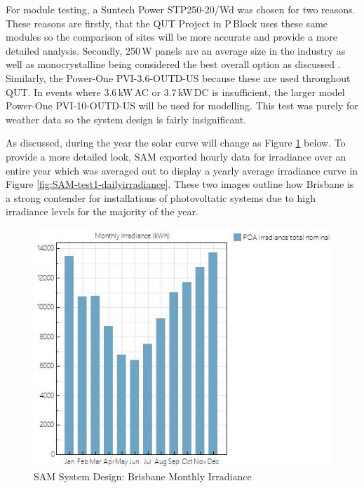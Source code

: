 For module testing, a Suntech Power STP250-20/Wd was chosen for two reasons. These reasons are firstly, that the QUT Project in P\,Block uses these same modules so the comparison of sites will be more accurate and provide a more detailed analysis. Secondly, 250\,W panels are an average size in the industry as well as monocrystalline being considered the best overall option as discussed \cite{Haberlin2012}. Similarly, the Power-One PVI-3.6-OUTD-US because these are used throughout QUT. In events where 3.6\,kW\,AC or 3.7\,kW\,DC is insufficient, the larger model Power-One PVI-10-OUTD-US will be used for modelling. This test was purely for weather data so the system design is fairly insignificant.  
\newline

As discussed, during the year the solar curve will change as Figure \ref{fig:SAM-test1-monthlyirradiance} below. To provide a more detailed look, SAM exported hourly data for irradiance over an entire year which was averaged out to display a yearly average irradiance curve in Figure \ref{fig:SAM-test1-dailyirradiance}. These two images outline how Brisbane is a strong contender for installations of photovoltatic systems due to high irradiance levels for the majority of the year.  

\begin{figure}[H]
	\hfill\includegraphics[width = 120mm]{images/sam/test1-monthlyirradiance}\hspace*{\fill}
	\caption{SAM System Design: Brisbane Monthly Irradiance} 
	\label{fig:SAM-test1-monthlyirradiance}
\end{figure}

